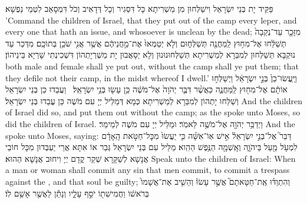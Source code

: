 {פַּקֵּיד יָת בְּנֵי יִשְׂרָאֵל וִישַׁלְּחוּן מִן מַשְׁרִיתָא כָּל דִּסְגִיר וְכָל דְּדָאִיב וְכֹל דִּמְסָאַב לִטְמֵי נַפְשָׁא׃}
{’Command the children of Israel, that they put out of the camp every leper, and every one that hath an issue, and whosoever is unclean by the dead;}{}
{מִזָּכָ֤ר עַד־נְקֵבָה֙ תְּשַׁלֵּ֔חוּ אֶל־מִח֥וּץ לַֽמַּחֲנֶ֖ה תְּשַׁלְּח֑וּם וְלֹ֤א יְטַמְּאוּ֙ אֶת־מַ֣חֲנֵיהֶ֔ם אֲשֶׁ֥ר אֲנִ֖י שֹׁכֵ֥ן בְּתוֹכָֽם׃}
{מִדְּכַר עַד נוּקְבָּא תְּשַׁלְּחוּן לְמִבַּרָא לְמַשְׁרִיתָא תְּשַׁלְּחוּנוּנוּן וְלָא יְסָאֲבוּן יָת מַשְׁרְיָתְהוֹן דִּשְׁכִינְתִי שָׁרְיָא בֵּינֵיהוֹן׃}
{both male and female shall ye put out, without the camp shall ye put them; that they defile not their camp, in the midst whereof I dwell.’}{}
{וַיַּֽעֲשׂוּ־כֵן֙ בְּנֵ֣י יִשְׂרָאֵ֔ל וַיְשַׁלְּח֣וּ אוֹתָ֔ם אֶל־מִח֖וּץ לַֽמַּחֲנֶ֑ה כַּאֲשֶׁ֨ר דִּבֶּ֤ר יְהֹוָה֙ אֶל־מֹשֶׁ֔ה כֵּ֥ן עָשׂ֖וּ בְּנֵ֥י יִשְׂרָאֵֽל׃ \petucha }
{וַעֲבַדוּ כֵן בְּנֵי יִשְׂרָאֵל וְשַׁלַּחוּ יָתְהוֹן לְמִבַּרָא לְמַשְׁרִיתָא כְּמָא דְּמַלֵּיל יְיָ עִם מֹשֶׁה כֵּן עֲבַדוּ בְּנֵי יִשְׂרָאֵל׃}
{And the children of Israel did so, and put them out without the camp; as the \lord\space spoke unto Moses, so did the children of Israel.}{}
{וַיְדַבֵּ֥ר יְהֹוָ֖ה אֶל־מֹשֶׁ֥ה לֵּאמֹֽר׃}
{וּמַלֵּיל יְיָ עִם מֹשֶׁה לְמֵימַר׃}
{And the \lord\space spoke unto Moses, saying:}{}
{דַּבֵּר֮ אֶל־בְּנֵ֣י יִשְׂרָאֵל֒ אִ֣ישׁ אֽוֹ־אִשָּׁ֗ה כִּ֤י יַעֲשׂוּ֙ מִכׇּל־חַטֹּ֣את הָֽאָדָ֔ם לִמְעֹ֥ל מַ֖עַל בַּיהֹוָ֑ה וְאָֽשְׁמָ֖ה הַנֶּ֥פֶשׁ הַהִֽוא׃
}
{מַלֵּיל עִם בְּנֵי יִשְׂרָאֵל גְּבַר אוֹ אִתָּא אֲרֵי יַעְבְּדוּן מִכָּל חוֹבֵי אֲנָשָׁא לְשַׁקָּרָא שְׁקַר קֳדָם יְיָ וִיחוּב אֲנָשָׁא הַהוּא׃}
{Speak unto the children of Israel: When a man or woman shall commit any sin that men commit, to commit a trespass against the \lord, and that soul be guilty;}{}
{וְהִתְוַדּ֗וּ אֶֽת־חַטָּאתָם֮ אֲשֶׁ֣ר עָשׂוּ֒ וְהֵשִׁ֤יב אֶת־אֲשָׁמוֹ֙ בְּרֹאשׁ֔וֹ וַחֲמִישִׁת֖וֹ יֹסֵ֣ף עָלָ֑יו וְנָתַ֕ן לַאֲשֶׁ֖ר אָשַׁ֥ם לֽוֹ׃
}
